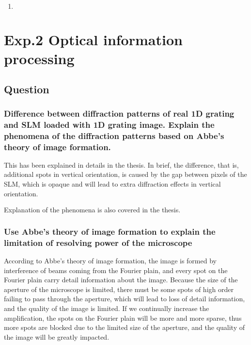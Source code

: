 \documentclass[12pt,a4paper,UTF8]{article}
\begin{document}
        \subsubsection{ }
        \begin{enumerate}[label=\arabic*.]
            \item 
        \end{enumerate}



\section{Exp.2 Optical information processing}

    \subsection{Question}
        \subsubsection{Difference between diffraction patterns of real 1D grating and SLM loaded with 1D grating image. Explain the phenomena of the diffraction patterns based on Abbe's theory of image formation.}
        This has been explained in details in the thesis. In brief, the difference, that is, additional spots in vertical orientation, 
        is caused by the gap between pixels of the SLM, which is opaque and will lead to extra diffraction effects in vertical orientation.

        Explanation of the phenomena is also covered in the thesis.
        \subsubsection{Use Abbe's theory of image formation to explain the limitation of resolving power of the microscope}
        According to Abbe's theory of image formation, the image is formed by interference of beams coming from the Fourier plain, 
        and every spot on the Fourier plain carry detail information about the image. 
        Because the size of the aperture of the microscope is limited, there must be some spots of high order failing to pass through the aperture,
        which will lead to loss of detail information, and the quality of the image is limited.
        If we continually increase the amplification, the spots on the Fourier plain will be more and more sparse, thus more spots are blocked due to the limited size of the aperture, and the quality of the image will be greatly impacted.
\end{document}
